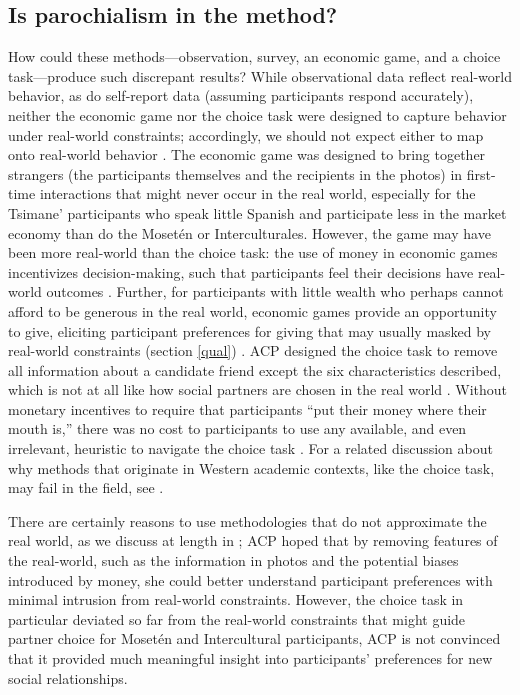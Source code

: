 \documentclass[bibauthoryear]{aa}
\begin{document}
	\subsection{Is parochialism in the method?}
How could these methods---observation, survey, an economic game, and a choice task---produce such discrepant results? While observational data reflect real-world behavior, as do self-report data (assuming participants respond accurately), neither the economic game nor the choice task were designed to capture behavior under real-world constraints; accordingly, we should not expect either to map onto real-world behavior  \citep{Pisor2020, gurven2008collective}. The economic game was designed to bring together strangers (the participants themselves and the recipients in the photos) in first-time interactions that might never occur in the real world, especially for the Tsimane' participants who speak little Spanish and participate less in the market economy than do the Moset\'en or Interculturales. However, the game may have been more real-world than the choice task: the use of money in economic games incentivizes decision-making, such that participants feel their decisions have real-world outcomes \citep{guala2005methodology}. Further, for participants with little wealth who perhaps cannot afford to be generous in the real world, economic games provide an opportunity to give, eliciting participant preferences for giving that may usually masked by real-world constraints (section \ref{qual}) \citep{Pisor2020}. ACP designed the choice task to remove all information about a candidate friend except the six characteristics described, which is not at all like how social partners are chosen in the real world \citep[see ][for a relevant review]{barclay2013strategies}. Without monetary incentives to require that participants ``put their money where their mouth is,'' there was no cost to participants to use any available, and even irrelevant, heuristic to navigate the choice task \citep{Pisor2020, xygalatasreligious}. For a related discussion about why methods that originate in Western academic contexts, like the choice task, may fail in the field, see \citet{hruschka2018learning}.

There are certainly reasons to use methodologies that do not approximate the real world, as we discuss at length in \citet{Pisor2020}; ACP hoped that by removing features of the real-world, such as the information in photos and the potential biases introduced by money, she could better understand participant preferences with minimal intrusion from real-world constraints. However, the choice task in particular deviated so far from the real-world constraints that might guide partner choice for Moset\'en and Intercultural participants, ACP is not convinced that it provided much meaningful insight into participants' preferences for new social relationships.
\end{document}
